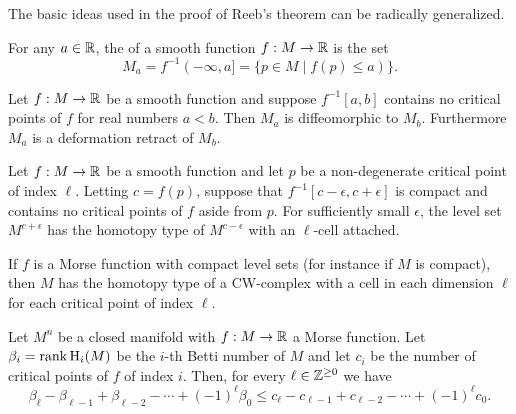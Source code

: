 The basic ideas used in the proof of Reeb's theorem can be radically generalized.

\begin{definition}
	For any $a\in \mathbb{R}$, the  of a smooth function $f : M \to \mathbb{R}$ is the set
	\begin{equation}
		M_a = f^{-1}(-\infty, a] = \{ p\in M \mid f(p)\leq a)\}.
	\end{equation}
\end{definition}

\begin{figure}
\end{figure}

\begin{theorem}
	Let $f : M \to \mathbb{R}$ be a smooth function and suppose $f^{-1}[a,b]$ contains no critical points of $f$ for real numbers $a<b$. Then $M_a$ is diffeomorphic to $M_b$. Furthermore $M_a$ is a deformation retract of $M_b$.
\end{theorem}

\begin{theorem}
	Let $f : M \to \mathbb{R}$ be a smooth function and let $p$ be a non-degenerate critical point of index $\ell$. Letting $c=f(p)$, suppose that $f^{-1}[c-\epsilon, c+\epsilon]$ is compact and contains no critical points of $f$ aside from $p$. For sufficiently small $\epsilon$, the level set $M^{c+\epsilon}$ has the homotopy type of $M^{c-\epsilon}$ with an $\ell$-cell attached.
\end{theorem}

\begin{theorem}
	If $f$ is a Morse function with compact level sets (for instance if $M$ is compact), then $M$ has the homotopy type of a CW-complex with a cell in each dimension $\ell$ for each critical point of index $\ell$.
\end{theorem}


\begin{theorem}
	Let $M^n$ be a closed manifold with $f : M\to \mathbb{R}$ a Morse function. Let $\beta_i=\operatorname{rank} \operatorname{H}_i(M)$ be the $i$-th Betti number of $M$ and let $c_i$ be the number of critical points of $f$ of index $i$. Then, for every $\ell\in \mathbb{Z}^{\geq 0}$ we have
	\begin{equation}
		\beta_\ell - \beta_{\ell-1} + \beta_{\ell-2} - \cdots +(-1)^\ell \beta_0 \leq c_\ell - c_{\ell-1} + c_{\ell-2} - \cdots + (-1)^\ell c_0.
	\end{equation}
\end{theorem}

